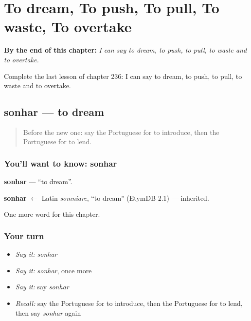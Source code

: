 
\chapter{To dream, To push, To pull, To waste, To overtake}
\label{ch:pt-to-dream-to-push-to-pull-to-waste-to-overtake}

\begin{chapteropening}
\textbf{By the end of this chapter:} \emph{I can say to dream, to push, to pull, to waste and to overtake.}

Complete the last lesson of chapter 236: I can say to dream, to push, to pull, to waste and to overtake.
\end{chapteropening}

\section[sonhar]{sonhar — to dream}

\label{lesson:PT-C236-sonhar}



\begin{quote}
Before the new one: say the Portuguese for to introduce, then the Portuguese for to lend.
\end{quote}

\subsection*{You'll want to know: sonhar}
\textbf{sonhar} — \textquotedblleft{}to dream\textquotedblright{}.

\begin{cousinweb}
\textbf{sonhar} $\leftarrow$ Latin \emph{somniare}, \textquotedblleft{}to dream\textquotedblright{} (EtymDB 2.1) — inherited.
\end{cousinweb}

\begin{grammarlens}[title={What you've built}]
One more word for this chapter.
\end{grammarlens}

\subsection*{Your turn}
\begin{itemize}
\raggedright
  \item \emph{Say it:} \emph{sonhar}
  \item \emph{Say it:} \emph{sonhar}, once more
  \item \emph{Say it:} say \emph{sonhar}
  \item \emph{Recall:} say the Portuguese for to introduce, then the Portuguese for to lend, then say \emph{sonhar} again
\end{itemize}

